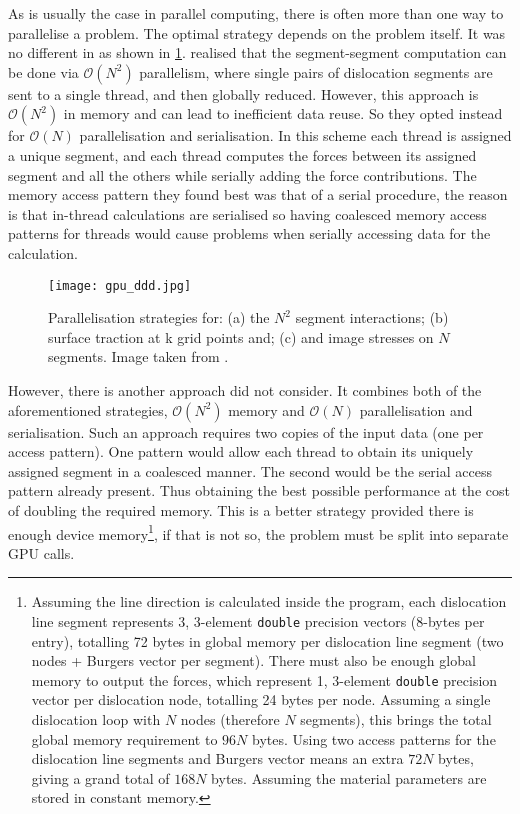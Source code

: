 As is usually the case in parallel computing, there is often more than one way to parallelise a problem. The optimal strategy depends on the problem itself. It was no different in \cite{gpu_ddd} as shown in \cref{f:gpu_ddd}.  realised that the segment-segment computation can be done via $ \mathcal{O}(N^{2}) $ parallelism, where single pairs of dislocation segments are sent to a single thread, and then globally reduced. However, this approach is $ \mathcal{O}(N^{2}) $ in memory and can lead to inefficient data reuse. So they opted instead for $ \mathcal{O}(N) $ parallelisation and serialisation. In this scheme each thread is assigned a unique segment, and each thread computes the forces between its assigned segment and all the others while serially adding the force contributions. The memory access pattern they found best was that of a serial procedure, the reason is that in-thread calculations are serialised so having coalesced memory access patterns for threads would cause problems when serially accessing data for the calculation.
\begin{figure}[t]
    \centering
    \texttt{[image: gpu\_ddd.jpg]}
    \caption[Parallelisation strategies for three problems in 3D DDD.]{Parallelisation strategies for: (a) the $ N^{2} $ segment interactions; (b) surface traction at k grid points and; (c) and image stresses on $ N $ segments. Image taken from \cite{gpu_ddd}.}
    \label{f:gpu_ddd}
\end{figure}

However, there is another approach \citet{gpu_ddd} did not consider. It combines both of the aforementioned strategies, $ \mathcal{O}(N^{2}) $ memory and $ \mathcal{O}(N) $ parallelisation and serialisation. Such an approach requires two copies of the input data (one per access pattern). One pattern would allow each thread to obtain its uniquely assigned segment in a coalesced manner. The second would be the serial access pattern already present. Thus obtaining the best possible performance at the cost of doubling the required memory. This is a better strategy provided there is enough device memory\footnote{Assuming the line direction is calculated inside the program, each dislocation line segment represents 3, 3-element \texttt{double} precision vectors (8-bytes per entry), totalling 72 bytes in global memory per dislocation line segment (two nodes + Burgers vector per segment). There must also be enough global memory to output the forces, which represent 1, 3-element \texttt{double} precision vector per dislocation node, totalling 24 bytes per node. Assuming a single dislocation loop with $ N $ nodes (therefore $ N $ segments), this brings the total global memory requirement to $ 96N $ bytes. Using two access patterns for the dislocation line segments and Burgers vector means an extra $ 72N $ bytes, giving a grand total of $ 168N $ bytes. Assuming the material parameters are stored in constant memory.}, if that is not so, the problem must be split into separate GPU calls.

